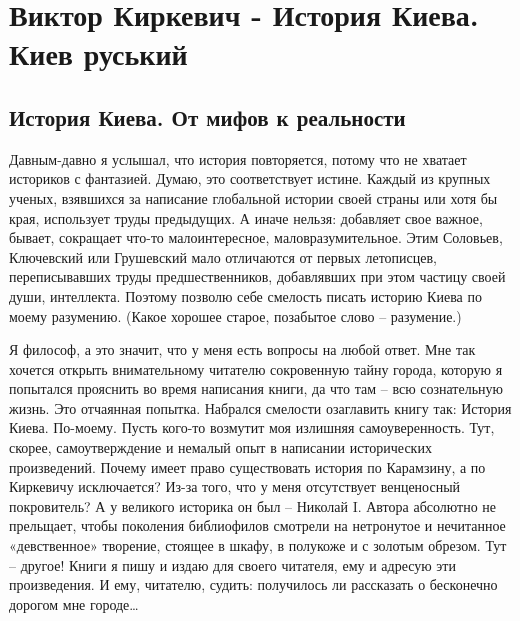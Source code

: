  
 
 
 
 
\chapter{Виктор Киркевич - История Киева. Киев руський}
\label{sec:books.kirkevich_viktor.kiev_ruskij}

\section{История Киева. От мифов к реальности}

Давным-давно я услышал, что история повторяется, потому что не хватает
историков с фантазией. Думаю, это соответствует истине. Каждый из крупных
ученых, взявшихся за написание глобальной истории своей страны или хотя бы
края, использует труды предыдущих. А иначе нельзя: добавляет свое важное,
бывает, сокращает что-то малоинтересное, маловразумительное. Этим Соловьев,
Ключевский или Грушевский мало отличаются от первых летописцев, переписывавших
труды предшественников, добавлявших при этом частицу своей души, интеллекта.
Поэтому позволю себе смелость писать историю Киева по моему разумению. (Какое
хорошее старое, позабытое слово – разумение.)

Я философ, а это значит, что у меня есть вопросы на любой ответ. Мне так
хочется открыть внимательному читателю сокровенную тайну города, которую я
попытался прояснить во время написания книги, да что там – всю сознательную
жизнь. Это отчаянная попытка. Набрался смелости озаглавить книгу так: История
Киева. По-моему. Пусть кого-то возмутит моя излишняя самоуверенность. Тут,
скорее, самоутверждение и немалый опыт в написании исторических произведений.
Почему имеет право существовать история по Карамзину, а по Киркевичу
исключается? Из-за того, что у меня отсутствует венценосный покровитель? А у
великого историка он был – Николай I. Автора абсолютно не прельщает, чтобы
поколения библиофилов смотрели на нетронутое и нечитанное «девственное»
творение, стоящее в шкафу, в полукоже и с золотым обрезом. Тут – другое! Книги
я пишу и издаю для своего читателя, ему и адресую эти произведения. И ему,
читателю, судить: получилось ли рассказать о бесконечно дорогом мне городе…

